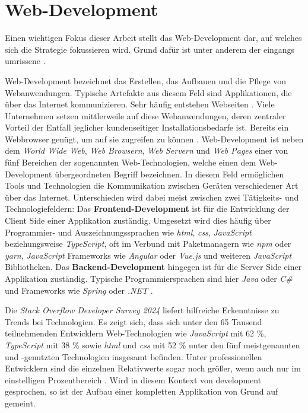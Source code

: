 \section{Web-Development}
\label{sec:02-01_web-development}

Einen wichtigen Fokus dieser Arbeit stellt das Web-Development dar, auf welches sich die  Strategie fokussieren wird. Grund dafür ist unter anderem der eingangs umrissene .

Web-Development bezeichnet das Erstellen, das Aufbauen und die Pflege von Webanwendungen. Typische Artefakte aus diesem Feld sind Applikationen, die über das Internet kommunizieren. Sehr häufig entstehen Webseiten \cite{209:Web-Development}. Viele Unternehmen setzen mittlerweile auf diese Webanwendungen, deren zentraler Vorteil der Entfall jeglicher kundenseitiger Installationsbedarfe ist. Bereits ein Webbrowser genügt, um auf sie zugreifen zu können \cite{002:Optimizing-Cloud-Applications-with-DevOps}. Web-Development ist neben dem \textit{World Wide Web}, \textit{Web Browsern}, \textit{Web Servern} und \textit{Web Pages} einer von fünf Bereichen der sogenannten Web-Technologien, welche einen dem Web-Development übergeordneten Begriff bezeichnen. In diesem Feld ermöglichen Tools und Technologien die Kommunikation zwischen Geräten verschiedener Art über das Internet. Unterschieden wird dabei meist zwischen zwei Tätigkeits- und Technologiefeldern: Das \textbf{Frontend-Development} ist für die Entwicklung der Client Side einer Applikation zuständig. Umgesetzt wird dies häufig über Programmier- und Auszeichnungssprachen wie \textit{\Gls{html}}, \textit{\Gls{css}}, \textit{JavaScript} beziehungsweise \textit{TypeScript}, oft im Verbund mit Paketmanagern wie \textit{npm} oder \textit{yarn}, \textit{JavaScript} Frameworks wie \textit{Angular} oder \textit{Vue.js} und weiteren \textit{JavaScript} Bibliotheken. Das \textbf{Backend-Development} hingegen ist für die Server Side einer Applikation zuständig. Typische Programmiersprachen sind hier \textit{Java} oder \textit{C\#} und Frameworks wie \textit{Spring} oder \textit{.NET} \cite{208:Web-Technology}.

Die \textit{Stack Overflow Developer Survey 2024} liefert hilfreiche Erkenntnisse zu Trends bei Technologien. Es zeigt sich, dass sich unter den 65 Tausend teilnehmenden Entwicklern Web-Technologien wie \textit{JavaScript} mit 62 \%, \textit{TypeScript} mit 38 \% sowie \textit{\Gls{html}} und \textit{\Gls{css}} mit 52 \% unter den fünf meistgenannten und -genutzten Technologien insgesamt befinden. Unter professionellen Entwicklern sind die einzelnen Relativwerte sogar noch größer, wenn auch nur im einstelligen Prozentbereich \cite{206:Developer-Survey-2024}. Wird in diesem Kontext von \Gls{development} gesprochen, so ist der Aufbau einer kompletten Applikation von Grund auf gemeint.

